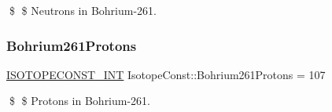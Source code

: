 \$ \$ Neutrons in Bohrium-\/261. \mbox{\label{group___isotope_const-_bohrium-_bh261_ga5e3d3224b12b0f7dbc30aa58e7c2544a}} 
\subsubsection{\texorpdfstring{Bohrium261\+Protons}{Bohrium261Protons}}
{\footnotesize\ttfamily \mbox{\hyperlink{group___isotope_const-_macros_ga5f18360b3e99483a35c32d789e62621c}{I\+S\+O\+T\+O\+P\+E\+C\+O\+N\+S\+T\+\_\+\+I\+NT}} Isotope\+Const\+::\+Bohrium261\+Protons = 107}

\$ \$ Protons in Bohrium-\/261. 